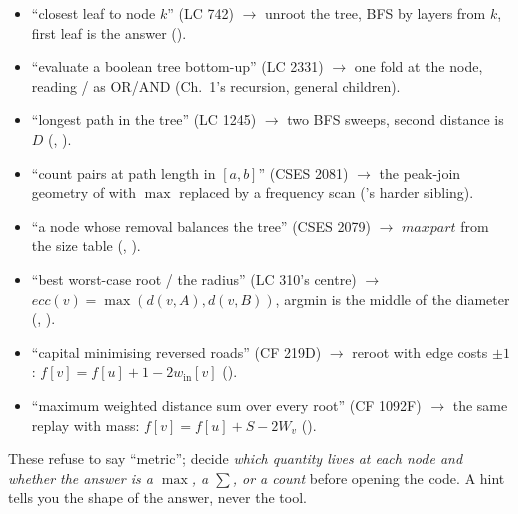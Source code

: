 \begin{itemize}[nosep, leftmargin=1.4em]
  \item ``closest leaf to node $k$'' (LC 742) $\longrightarrow$ unroot the tree, BFS by layers
        from $k$, first leaf is the answer ().
  \item ``evaluate a boolean tree bottom-up'' (LC 2331) $\longrightarrow$ one fold at the node,
        reading / as OR/AND (Ch.~1's recursion, general children).
  \item ``longest path in the tree'' (LC 1245) $\longrightarrow$ two BFS sweeps, second distance
        is $D$ (, ).
  \item ``count pairs at path length in $[a,b]$'' (CSES 2081) $\longrightarrow$ the peak-join
        geometry of  with $\max$ replaced by a frequency scan ('s
        harder sibling).
  \item ``a node whose removal balances the tree'' (CSES 2079) $\longrightarrow$ $\mathit{maxpart}$
        from the size table (, ).
  \item ``best worst-case root / the radius'' (LC 310's centre) $\longrightarrow$
        $\mathit{ecc}(v)=\max(d(v,A),d(v,B))$, argmin is the middle of the diameter
        (, ).
  \item ``capital minimising reversed roads'' (CF 219D) $\longrightarrow$ reroot with edge costs
        $\pm1$: $f[v]=f[u]+1-2w_{\text{in}}[v]$ ().
  \item ``maximum weighted distance sum over every root'' (CF 1092F) $\longrightarrow$ the same
        replay with mass: $f[v]=f[u]+S-2W_v$ ().
\end{itemize}


These refuse to say ``metric''; decide \emph{which quantity lives at each node and whether the
answer is a $\max$, a $\sum$, or a count} before opening the code. A hint tells you the shape
of the answer, never the tool.

